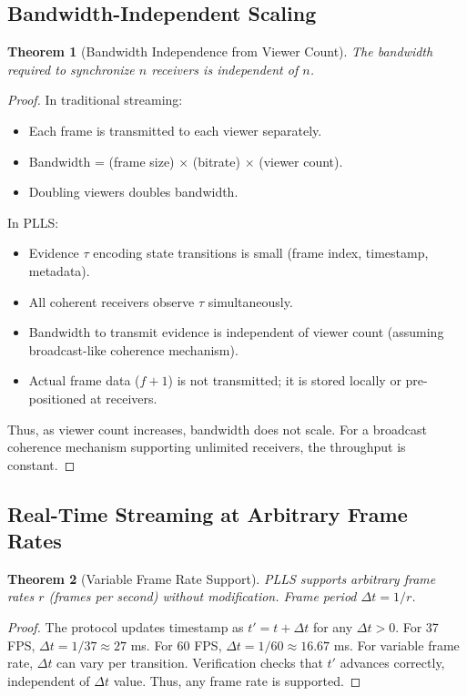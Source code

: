 \documentclass[twocolumn,10pt,a4paper]{article}
\theoremstyle{plain}
\newtheorem{theorem}{Theorem}[section]
\theoremstyle{definition}
\begin{document}
\subsection{Bandwidth-Independent Scaling}

\begin{theorem}[Bandwidth Independence from Viewer Count]
The bandwidth required to synchronize $n$ receivers is independent of $n$.
\end{theorem}

\begin{proof}
In traditional streaming:
\begin{itemize}
\item Each frame is transmitted to each viewer separately.
\item Bandwidth = (frame size) $\times$ (bitrate) $\times$ (viewer count).
\item Doubling viewers doubles bandwidth.
\end{itemize}

In PLLS:
\begin{itemize}
\item Evidence $\tau$ encoding state transitions is small (frame index, timestamp, metadata).
\item All coherent receivers observe $\tau$ simultaneously.
\item Bandwidth to transmit evidence is independent of viewer count (assuming broadcast-like coherence mechanism).
\item Actual frame data ($f+1$) is not transmitted; it is stored locally or pre-positioned at receivers.
\end{itemize}

Thus, as viewer count increases, bandwidth does not scale. For a broadcast coherence mechanism supporting unlimited receivers, the throughput is constant.
\end{proof}

\subsection{Real-Time Streaming at Arbitrary Frame Rates}

\begin{theorem}[Variable Frame Rate Support]
PLLS supports arbitrary frame rates $r$ (frames per second) without modification. Frame period $\Delta t = 1/r$.
\end{theorem}

\begin{proof}
The protocol updates timestamp as $t' = t + \Delta t$ for any $\Delta t > 0$. For 37 FPS, $\Delta t = 1/37 \approx 27$ ms. For 60 FPS, $\Delta t = 1/60 \approx 16.67$ ms. For variable frame rate, $\Delta t$ can vary per transition. Verification checks that $t'$ advances correctly, independent of $\Delta t$ value. Thus, any frame rate is supported.
\end{proof}
\end{document}

